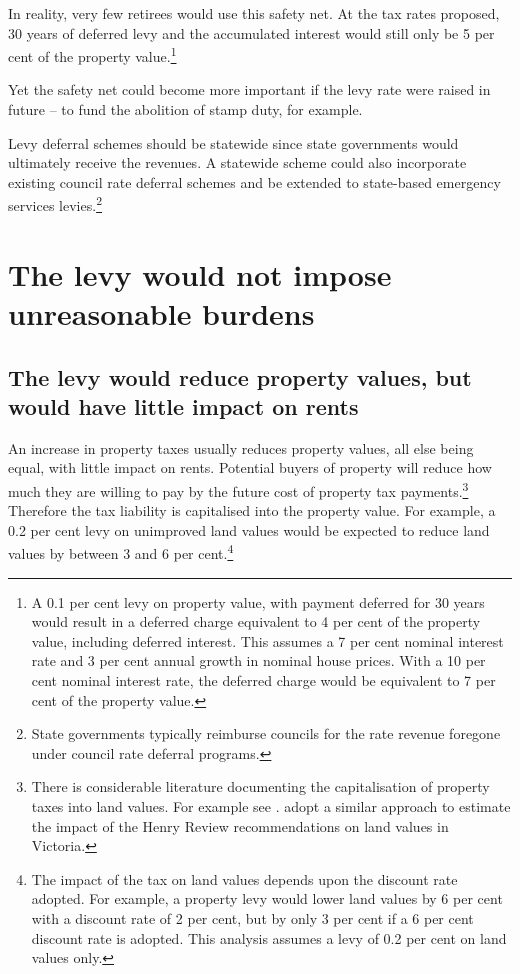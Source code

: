 In reality, very few retirees would use this safety net. At the tax rates proposed, 30 years of deferred levy and the accumulated interest would still only be 5 per cent of the property value.\footnote{A 0.1 per cent levy on property value, with payment deferred for 30 years would result in a deferred charge equivalent to 4 per cent of the property value, including deferred interest. This assumes a 7 per cent nominal interest rate and 3 per cent annual growth in nominal house prices. With a 10 per cent nominal interest rate, the deferred charge would be equivalent to 7 per cent of the property value.}  

Yet the safety net could become more important if the levy rate were raised in future -- to fund the abolition of stamp duty, for example. 

Levy deferral schemes should be statewide since state governments would ultimately receive the revenues. A statewide scheme could also incorporate existing council rate deferral schemes and be extended to state-based emergency services levies.\footnote{State governments typically reimburse councils for the rate revenue foregone under council rate deferral programs.} 

\chapter{The levy would not impose unreasonable burdens\label{chapter:PROP-7}}
\section{The levy would reduce property values, but would have little impact on rents\label{sec:PROP-7-1}}
An increase in property taxes usually reduces property values, all else being equal, with little impact on rents. Potential buyers of property will reduce how much they are willing to pay by the future cost of property tax payments.\footnote{There is considerable literature documenting the capitalisation of property taxes into land values. For example see \textcites{Oates1969}{oates2009simple}. \textcite[][22]{WoodOngCigdemEtAl2012} adopt a similar approach to estimate the impact of the Henry Review recommendations on land values in Victoria.}  Therefore the tax liability is capitalised into the property value. For example, a 0.2 per cent levy on unimproved land values would be expected to reduce land values by between 3 and 6 per cent.\footnote{The impact of the tax on land values depends upon the discount rate adopted.  For example, a property levy would lower land values by 6 per cent with a discount rate of 2 per cent, but by only 3 per cent if a 6 per cent discount rate is adopted. This analysis assumes a levy of 0.2 per cent on land values only.}

